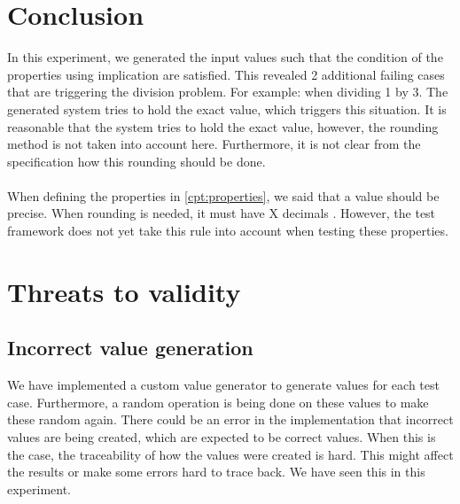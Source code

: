 \section{Conclusion}
In this experiment, we generated the input values such that the condition of
the properties using implication are satisfied. This revealed 2 additional
failing cases that are triggering the division problem. For example: when
dividing 1 by 3. The generated system tries to hold the exact value, which
triggers this situation. It is reasonable that the system tries to hold the
exact value, however, the rounding method is not taken into account here.
Furthermore, it is not clear from the specification how this rounding should be
done.\\
\\
When defining the properties in \autoref{cpt:properties}, we said that a value
should be precise. When rounding is needed, it must have X decimals
. However, the test framework does not yet take this rule into
account when testing these properties.

\section{Threats to validity}

\subsection*{Incorrect value generation}
We have implemented a custom value generator to generate values for each test
case. Furthermore, a random operation is being done on these values to make
these random again. There could be an error in the implementation that incorrect
values are being created, which are expected to be correct values. When this is
the case, the traceability of how the values were created is hard. This might
affect the results or make some errors hard to trace back. We have seen this in
this experiment.

